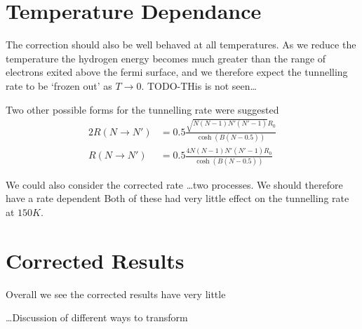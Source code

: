 \section{Temperature Dependance}
The correction should also be well behaved
at all temperatures. As we reduce the
temperature the hydrogen
energy becomes much greater than the
range of electrons exited above the fermi
surface, and we therefore expect the tunnelling
rate to be `frozen out' as \(T\rightarrow{}0\).
TODO-THis is not seen\ldots

Two other possible forms for the
tunnelling rate were suggested
\begin{alignat}{2}
    R(N\rightarrow{}N') & = 0.5\frac{\sqrt{N(N-1)N'(N'-1)} R_0}{\cosh{(B(N - 0.5))}} \\
    R(N\rightarrow{}N') & = 0.5\frac{4N(N-1)N'(N'-1) R_0}{\cosh{(B(N - 0.5))}}
\end{alignat}

We could also consider the corrected rate
\ldots two processes. We should therefore
have a rate dependent
Both of these had very little
effect on the tunnelling rate
at \(150K\).

\section{Corrected Results}
Overall we see the corrected results
have very little



\ldots Discussion of different ways to transform



